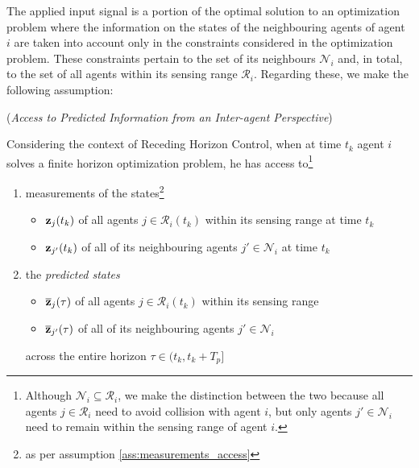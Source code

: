 The applied input signal is a portion of the optimal solution to an
optimization problem where the information on the states of the neighbouring
agents of agent $i$ are taken into account only in the constraints considered
in the optimization problem. These constraints pertain to the set of its
neighbours $\mathcal{N}_i$ and, in total, to the set of all agents within its
sensing range $\mathcal{R}_i$. Regarding these, we make the following assumption:

\begin{bw_box}
  \begin{assumption} (\textit{Access to Predicted Information from an
    Inter-agent Perspective})
    \label{ass:access_to_predicted_info_n}

Considering the context of Receding Horizon Control, when
at time $t_k$ agent $i$ solves a finite horizon optimization problem, he has
access to\footnote{Although
  $\mathcal{N}_i \subseteq \mathcal{R}_i$, we make the distinction between
  the two because all agents $j \in \mathcal{R}_i$ need to avoid collision
  with agent $i$, but only agents $j' \in \mathcal{N}_i$ need to remain
  within the sensing range of agent $i$.
}

\begin{enumerate}
  \item measurements of the states\footnote{as per assumption
    \eqref{ass:measurements_access}}
    \begin{itemize}
      \item $\bm{\mathbf{z}}_j(t_k)$ of all agents $j \in \mathcal{R}_i(t_k)$ within its sensing range at time $t_k$
      \item $\bm{\mathbf{z}}_{j'}(t_k)$ of all of its neighbouring agents $j' \in \mathcal{N}_i$ at time $t_k$
      \end{itemize}
    \item the \textit{predicted states}
      \begin{itemize}
        \item $\overline{\bm{\mathbf{z}}}_j(\tau)$ of all agents $j \in \mathcal{R}_i(t_k)$ within its sensing range
        \item $\overline{\bm{\mathbf{z}}}_{j'}(\tau)$ of all of its neighbouring agents $j' \in \mathcal{N}_i$
      \end{itemize}
      across the entire horizon $\tau \in (t_k, t_k + T_p]$
\end{enumerate}
\end{assumption}
\end{bw_box}

